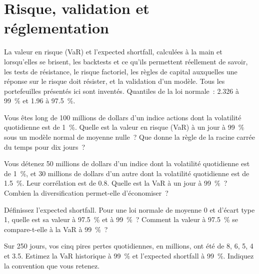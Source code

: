\chapter{Risque, validation et réglementation}\label{ch:iv2:risk-validation-and-regulation}

\begin{ivtrains}
La valeur en risque (VaR) et l'expected shortfall, calculées à la main et lorsqu'elles se brisent, les backtests et ce qu'ils permettent réellement de savoir, les tests de résistance, le risque factoriel, les règles de capital auxquelles une réponse sur le risque doit résister, et la validation d'un modèle. Tous les portefeuilles présentés ici sont inventés. Quantiles de la loi normale~: 2.326 à 99~\% et 1.96 à 97.5~\%.
\end{ivtrains}

\begin{question}\label{iq:iv2:risk-validation-and-regulation:1}
Vous êtes long de 100 millions de dollars d'un indice actions dont la volatilité quotidienne est de 1~\%. Quelle est la valeur en risque (VaR) à un jour à 99~\% sous un modèle normal de moyenne nulle~? Que donne la règle de la racine carrée du temps pour dix jours~?
\end{question}

\begin{question}\label{iq:iv2:risk-validation-and-regulation:2}
Vous détenez 50 millions de dollars d'un indice dont la volatilité quotidienne est de 1~\%, et 30 millions de dollars d'un autre dont la volatilité quotidienne est de 1.5~\%. Leur corrélation est de 0.8. Quelle est la VaR à un jour à 99~\%~? Combien la diversification permet-elle d'économiser~?
\end{question}

\begin{question}\label{iq:iv2:risk-validation-and-regulation:3}
Définissez l'expected shortfall. Pour une loi normale de moyenne 0 et d'écart type 1, quelle est sa valeur à 97.5~\% et à 99~\%~? Comment la valeur à 97.5~\% se compare-t-elle à la VaR à 99~\%~?
\end{question}

\begin{question}\label{iq:iv2:risk-validation-and-regulation:4}
Sur 250 jours, vos cinq pires pertes quotidiennes, en millions, ont été de 8, 6, 5, 4 et 3.5. Estimez la VaR historique à 99~\% et l'expected shortfall à 99~\%. Indiquez la convention que vous retenez.
\end{question}

